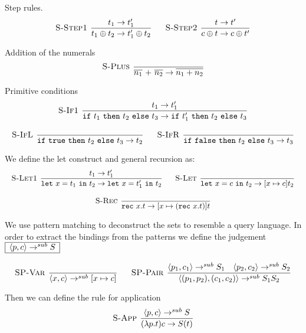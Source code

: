 \documentclass[a4paper]{article}
\newcommand{\s}[1]{\mathtt{#1}}
\newcommand{\sif}{\s{if\ }}
\newcommand{\sthen}{\s{\ then\ }}
\newcommand{\selse}{\s{\ else\ }}
\newcommand{\sifthenelse}[3]{\sif #1 \sthen #2 \selse #3}
\newcommand{\sletin}[2]{\s{let\ } #1 \s{\ in\ } #2}
\newcommand{\srec}{\s{rec\ }}
\newcommand{\strue}{\s{true}}
\newcommand{\sfalse}{\s{false}}
\newcommand{\step}{\to}
\newcommand{\stepsub}{\step^{sub}}
\newcommand{\angled}[1]{\langle #1\rangle}
\renewcommand{\rule}[3][]{\ \mbox{\textsc{#1 }}\dfrac{#2}{#3}\ }
\newcommand{\smbox}[1]{
  $\begin{array}{|c|}
    \hline
    #1 \\
    \hline
  \end{array}$
}
\begin{document}
Step rules.
\[\begin{array}{c}
\rule[S-Step1]{t_1 \step t_1'}{t_1 \oplus t_2 \step t_1' \oplus t_2}\quad
\rule[S-Step2]{t \step t'}{c \oplus t \step c \oplus t'}
\end{array}
\]

Addition of the numerals
\[
\rule[S-Plus]{}{\overline{n_1} \s{\ +\ } \overline{n_2} \step \overline{n_1 + n_2}}
\]

Primitive conditions
\[\begin{array}{c}
\rule[S-If1]{t_1 \step t_1'}{\sifthenelse{t_1}{t_2}{t_3} \step \sifthenelse{t_1'}{t_2}{t_3}}\\\\
\rule[S-IfL]{}{\sifthenelse{\strue}{t_2}{t_3} \step t_2}\quad
\rule[S-IfR]{}{\sifthenelse{\sfalse}{t_2}{t_3} \step t_3}
\end{array}\]

We define the let construct and general recursion as:
\[\begin{array}{c}
\rule[S-Let1]{t_1 \step t_1'}
  {\sletin{x=t_1}{t_2} \step \sletin{x=t_1'}{t_2}}\quad
\rule[S-Let]{}{\sletin{x=c}{t_2} \step [x \mapsto c ] t_2}\\\\
\rule[S-Rec]{}{\srec x.t \step [x \mapsto (\srec x.t)] t}
\end{array}\]


We use pattern matching to deconstruct the sets to resemble a query language.
In order to extract the bindings from the patterns we define the judgement \smbox{\angled{p,c} \stepsub S}
\[
\rule[SP-Var]{}{\angled{x,c} \stepsub [x\mapsto c]}\quad
\rule[SP-Pair]{\angled{p_1, c_1} \stepsub S_1 \quad \angled{p_2, c_2} \stepsub S_2}
{\angled{(p_1,p_2), (c_1, c_2)} \stepsub S_1S_2}
\]

Then we can define the rule for application
\[
\rule[S-App]{\angled{p, c} \stepsub S}{(\lambda p.t) c \step S(t)}
\]
\end{document}
